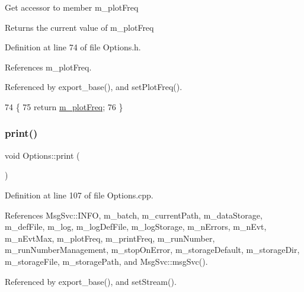Get accessor to member m\+\_\+plot\+Freq \begin{DoxyReturn}{Returns}
the current value of m\+\_\+plot\+Freq 
\end{DoxyReturn}


Definition at line 74 of file Options.\+h.



References m\+\_\+plot\+Freq.



Referenced by export\+\_\+base(), and set\+Plot\+Freq().


\begin{DoxyCode}
74                                   \{
75                 \textcolor{keywordflow}{return} \hyperlink{classOptions_aa7f7161bc67732b310937afb137657a0}{m\_plotFreq};
76         \}
\end{DoxyCode}
\mbox{\label{classOptions_a3f4593f64bc8c8afc3ade9237adb83e1}} 
\subsubsection{\texorpdfstring{print()}{print()}}
{\footnotesize\ttfamily void Options\+::print (\begin{DoxyParamCaption}{ }\end{DoxyParamCaption})}



Definition at line 107 of file Options.\+cpp.



References Msg\+Svc\+::\+I\+N\+FO, m\+\_\+batch, m\+\_\+current\+Path, m\+\_\+data\+Storage, m\+\_\+def\+File, m\+\_\+log, m\+\_\+log\+Def\+File, m\+\_\+log\+Storage, m\+\_\+n\+Errors, m\+\_\+n\+Evt, m\+\_\+n\+Evt\+Max, m\+\_\+plot\+Freq, m\+\_\+print\+Freq, m\+\_\+run\+Number, m\+\_\+run\+Number\+Management, m\+\_\+stop\+On\+Error, m\+\_\+storage\+Default, m\+\_\+storage\+Dir, m\+\_\+storage\+File, m\+\_\+storage\+Path, and Msg\+Svc\+::msg\+Svc().



Referenced by export\+\_\+base(), and set\+Stream().


